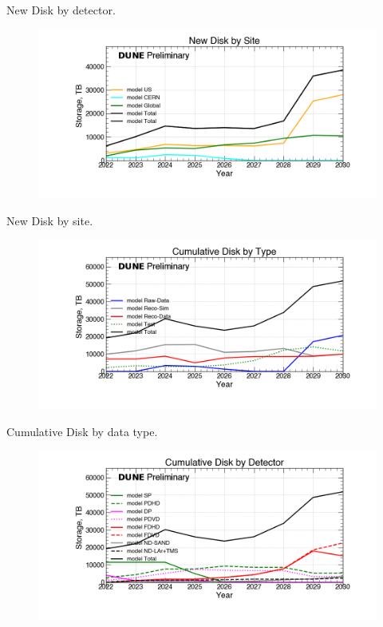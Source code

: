 \begin{table}[h]
\label{tab:DiskByYearByDetector}
\caption{New Disk by detector.}
\end{table}
\pagebreak
\begin{figure}[ht]
\centering\includegraphics[height=0.4\textwidth]{Feb24_noMWC_New-Disk-by-Site-Storage.png}\end{figure}
\begin{table}[h]
\label{tab:DiskByYearBySite}
\caption{New Disk by site.}
\end{table}
\pagebreak
\begin{figure}[ht]
\centering\includegraphics[height=0.4\textwidth]{Feb24_noMWC_Cumulative-Disk-by-Type-Storage.png}\end{figure}
\begin{table}[h]
\label{tab:DiskByYearByType}
\caption{Cumulative Disk by data type.}
\end{table}
\pagebreak
\begin{figure}[ht]
\centering\includegraphics[height=0.4\textwidth]{Feb24_noMWC_Cumulative-Disk-by-Detector-Storage.png}\end{figure}
